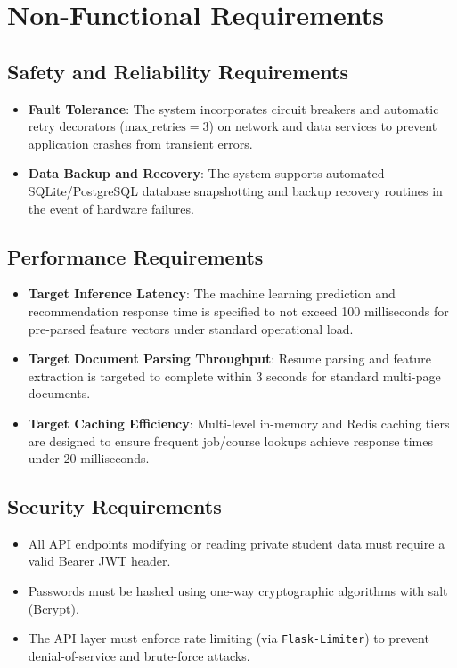 \documentclass[12pt,a4paper]{report}
\begin{document}
\section{Non-Functional Requirements}

\subsection{Safety and Reliability Requirements}
\begin{itemize}
    \item \textbf{Fault Tolerance}: The system incorporates circuit breakers and automatic retry decorators ($\text{max\_retries}=3$) on network and data services to prevent application crashes from transient errors.
    \item \textbf{Data Backup and Recovery}: The system supports automated SQLite/PostgreSQL database snapshotting and backup recovery routines in the event of hardware failures.
\end{itemize}

\subsection{Performance Requirements}
\begin{itemize}
    \item \textbf{Target Inference Latency}: The machine learning prediction and recommendation response time is specified to not exceed 100 milliseconds for pre-parsed feature vectors under standard operational load.
    \item \textbf{Target Document Parsing Throughput}: Resume parsing and feature extraction is targeted to complete within 3 seconds for standard multi-page documents.
    \item \textbf{Target Caching Efficiency}: Multi-level in-memory and Redis caching tiers are designed to ensure frequent job/course lookups achieve response times under 20 milliseconds.
\end{itemize}

\subsection{Security Requirements}
\begin{itemize}
    \item All API endpoints modifying or reading private student data must require a valid Bearer JWT header.
    \item Passwords must be hashed using one-way cryptographic algorithms with salt (Bcrypt).
    \item The API layer must enforce rate limiting (via \texttt{Flask-Limiter}) to prevent denial-of-service and brute-force attacks.
\end{itemize}
\end{document}
